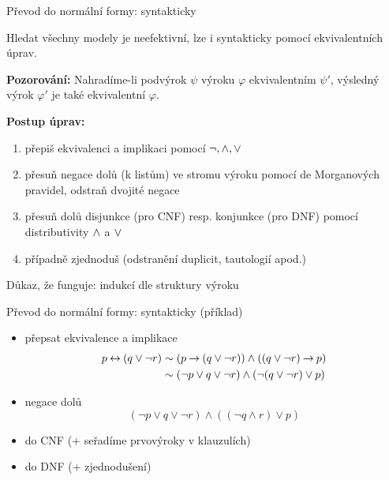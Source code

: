 \documentclass{beamer}
\begin{document}
\begin{frame}{Převod do normální formy: syntakticky}

    Hledat všechny modely je neefektivní, lze i syntakticky pomocí \alert{ekvivalentních úprav}.

    \pause

    \textbf{Pozorování:} Nahradíme-li podvýrok $\psi$ výroku $\varphi$ ekvivalentním $\psi'$, výsledný výrok $\varphi'$ je také ekvivalentní $\varphi$.

    \pause

    \textbf{Postup úprav:}
    \pause
    \begin{enumerate}[<+->]
        \item přepiš ekvivalenci a implikaci pomocí $\neg,{\land},{\lor}$
        \item přesuň negace dolů (k listům) ve stromu výroku pomocí de Morganových pravidel, odstraň dvojité negace
        \item přesuň dolů disjunkce (pro CNF) resp. konjunkce (pro DNF) pomocí distributivity ${\land}$ a ${\lor}$
        \item případně zjednoduš (odstranění duplicit, tautologií apod.)
    \end{enumerate}

    Důkaz, že funguje: indukcí dle struktury výroku

\end{frame}


\begin{frame}{Převod do normální formy: syntakticky (příklad)}


   \pause
    \begin{itemize}[<+->]
        \item přepsat ekvivalence a implikace
        \begin{align*}
            p\mathbin{\leftrightarrow} (q\lor \neg r) &\sim (p\mathbin{\rightarrow} (q\lor \neg r)) \land ((q\lor \neg r) \mathbin{\rightarrow} p)\\
            &\sim (\neg p\lor q\lor \neg r) \land (\neg (q\lor \neg r) \lor p)
        \end{align*}
        \item negace dolů
        $$
        (\neg p\lor q\lor \neg r) \land ( (\neg q\land r) \lor p)
        $$
        \item do CNF (+ seřadíme prvovýroky v klauzulích)

        \item do DNF (+ zjednodušení)
    \end{itemize}

\end{frame}
\end{document}
